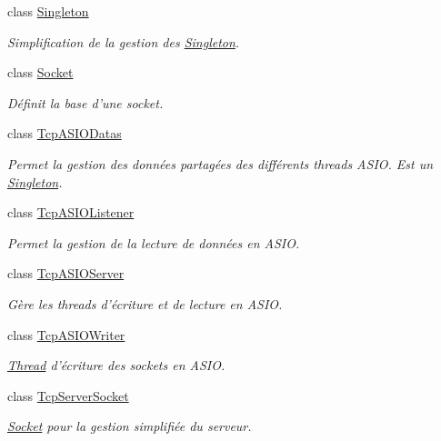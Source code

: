 \begin{DoxyCompactItemize}
class \hyperlink{classmognetwork_1_1_singleton}{Singleton}
\begin{DoxyCompactList}\small\item\em Simplification de la gestion des \hyperlink{classmognetwork_1_1_singleton}{Singleton}. \end{DoxyCompactList}\item 
class \hyperlink{classmognetwork_1_1_socket}{Socket}
\begin{DoxyCompactList}\small\item\em Définit la base d'une socket. \end{DoxyCompactList}\item 
class \hyperlink{classmognetwork_1_1_tcp_a_s_i_o_datas}{Tcp\-A\-S\-I\-O\-Datas}
\begin{DoxyCompactList}\small\item\em Permet la gestion des données partagées des différents threads A\-S\-I\-O. Est un \hyperlink{classmognetwork_1_1_singleton}{Singleton}. \end{DoxyCompactList}\item 
class \hyperlink{classmognetwork_1_1_tcp_a_s_i_o_listener}{Tcp\-A\-S\-I\-O\-Listener}
\begin{DoxyCompactList}\small\item\em Permet la gestion de la lecture de données en A\-S\-I\-O. \end{DoxyCompactList}\item 
class \hyperlink{classmognetwork_1_1_tcp_a_s_i_o_server}{Tcp\-A\-S\-I\-O\-Server}
\begin{DoxyCompactList}\small\item\em Gère les threads d'écriture et de lecture en A\-S\-I\-O. \end{DoxyCompactList}\item 
class \hyperlink{classmognetwork_1_1_tcp_a_s_i_o_writer}{Tcp\-A\-S\-I\-O\-Writer}
\begin{DoxyCompactList}\small\item\em \hyperlink{classmognetwork_1_1_thread}{Thread} d'écriture des sockets en A\-S\-I\-O. \end{DoxyCompactList}\item 
class \hyperlink{classmognetwork_1_1_tcp_server_socket}{Tcp\-Server\-Socket}
\begin{DoxyCompactList}\small\item\em \hyperlink{classmognetwork_1_1_socket}{Socket} pour la gestion simplifiée du serveur. \end{DoxyCompactList}\item 

\end{DoxyCompactItemize}
